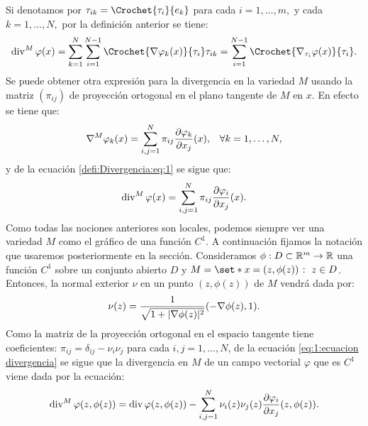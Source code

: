 \documentclass[a4paper,11pt,spanish, twoside, leqno]{tfm-uam}
\begin{document}
Si denotamos por $\tau_{ik}=\Crochet{\tau_{i}}{e_{k}}$ para cada $i=1,\ldots,m,$ y cada $k=1,\ldots, N,$ por la definición anterior se tiene:
\begin{align*}
\displaystyle\div^{M}\varphi(x)=\sum_{k=1}^{N}\sum^{N-1}_{i=1}\Crochet{\nabla{\varphi_{k}(x)}}{\tau_{i}}\tau_{ik}=\sum_{i=1}^{N-1}\Crochet{\nabla_{\tau_{i}}\varphi(x)}{\tau_{i}}. 
\end{align*}
Se puede obtener otra expresión para la divergencia en la variedad $M$ usando la matriz $(\pi_{ij})$ de proyección ortogonal  en el plano tangente de $M$ en $x$. En efecto se tiene que:
\begin{align*}
\begin{array}{ll}
\displaystyle
\nabla^{M}\varphi_{k}(x)=\sum^{N}_{i,j=1}\pi_{ij}\diffp{\varphi_{k}}{x_{j}}(x),& \forall k=1, \ldots,N,
\end{array}
\end{align*}
y de la ecuación \ref{defi:Divergencia:eq:1} se sigue que:
\begin{align}\label{eq:1:ecuacion divergencia}
\div^{M}\varphi(x)=\sum^{N}_{i,j=1}\pi_{ij}\diffp{\varphi_{i}}{x_{j}}(x).
\end{align}
Como todas  las nociones anteriores son locales, podemos siempre ver una variedad $M$ como el gráfico de una función $C^{1}$. A continuación fijamos la notación que usaremos posteriormente en la sección. Consideramos $\phi:D\subset \mathbb{R}^{m}\to \mathbb{R}$ una función $C^{1}$ sobre un conjunto abierto $D$ y $M=\set*{x=(z,\phi(z))\given z\in D}$. Entonces, la normal exterior $\nu$  en un punto $(z,\phi(z))$ de $M$ vendrá dada por:
\begin{align*}
\nu(z)=\dfrac{1}{\sqrt{1+\lvert\nabla{\phi(z)}\rvert^{2}}}(-\nabla{\phi}(z),1).
\end{align*}
Como la matriz de la proyección ortogonal en el espacio tangente tiene coeficientes: $\pi_{ij}=\delta_{ij}-\nu_{i}\nu_{j}$ para cada $i,j=1, \ldots,N$, de la ecuación \ref{eq:1:ecuacion divergencia} se sigue que la divergencia en $M$ de un campo vectorial $\varphi$ que es $C^{1}$ viene dada por la ecuación:
\begin{align}
\div^{M}\varphi(z,\phi(z))=\div\varphi(z,\phi(z))-\sum_{i,j=1}^{N}\nu_{i}(z)\nu_{j}(z)\diffp{\varphi_{i}}{x_{j}}(z,\phi(z)).
\end{align}
\end{document}
